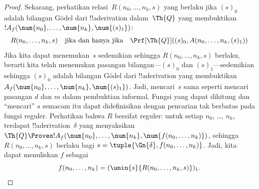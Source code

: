 \documentclass[../../../include/open-logic-section]{subfiles}
\begin{document}
\begin{proof}
Sekarang, perhatikan relasi~$R(n_0, \dots, n_k, s)$ yang berlaku jika
$(s)_0$ adalah bilangan G\"odel dari !!a{derivation} dalam~$\Th{Q}$ yang
membuktikan $!A_f(\num{n_0}, \dots, \num{n_k}, \num{(s)_1})$:
\[
R(n_0, \dots, n_k, s) \quad\text{jika dan hanya jika}\quad
\Prf[\Th{Q}]((s)_0, A(n_0, \dots, n_k, (s)_1))
\]
Jika kita dapat menemukan~$s$ sedemikian sehingga $R(n_0, \dots, n_k, s)$
berlaku, berarti kita telah menemukan pasangan bilangan---$(s)_0$ dan
$(s)_1$---sedemikian sehingga $(s)_0$ adalah bilangan G\"odel dari
!!a{derivation} yang membuktikan
$A_f(\num{n_0}, \dots, \num{n_k}, \num{(s)_1})$.
Jadi, mencari~$s$ sama seperti mencari pasangan $d$ dan $m$ dalam pembuktian
informal. Fungsi yang dapat dihitung dan ``mencari'' $s$ semacam itu dapat
didefinisikan dengan pencarian tak berbatas pada fungsi reguler. Perhatikan
bahwa $R$ bersifat reguler: untuk setiap $n_0$, \dots, $n_k$, terdapat
!!a{derivation}~$\delta$ yang menyaksikan
$\Th{Q} \Proves !A_f(\num{n_0}, \dots, \num{n_k},
\num{f(n_0, \dots, n_k)})$, sehingga
$R(n_0, \dots, n_k, s)$ berlaku bagi
$s = \tuple{\Gn{\delta}, f(n_0, \dots, n_k)}$. Jadi, kita dapat menuliskan
$f$ sebagai
\[
f(n_0,\dots,n_{k}) = (\umin{s}{R(n_0, \dots, n_k, s)})_1.
\]
\end{proof}
\end{document}
